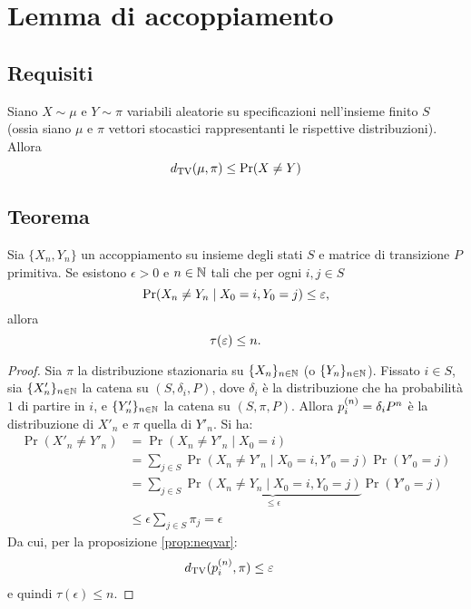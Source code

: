 \section{Lemma di accoppiamento}


\subsection{Requisiti}
\begin{prop}\label{prop:neqvar}
	Siano $X\sim\mu$ e $Y\sim\pi$ variabili aleatorie su specificazioni nell'insieme finito $S$ (ossia siano $\mu$ e $\pi$ vettori stocastici rappresentanti le rispettive distribuzioni). Allora
	\begin{equation*}
		\dtv(\mu,\pi)\le\Pr(X\ne Y)
	\end{equation*}
\end{prop}


\subsection{Teorema}
\begin{lemma}[di accoppiamento]
	Sia $\{X_n,Y_n\}$ un accoppiamento su insieme degli stati $S$ e matrice di transizione $P$ primitiva. Se esistono $\epsilon>0$ e $n\in\N$ tali che per ogni $i,j\in S$
	\begin{equation*}
		\Pr(X_n\ne Y_n\mid X_0=i,Y_0=j) \le \epsilon \text,
	\end{equation*}
	allora
	\begin{equation*}
		\tau(\epsilon) \le n \text.
	\end{equation*}
\end{lemma}
\begin{proof}
	Sia $\pi$ la distribuzione stazionaria su $\chain X$ (o $\chain Y$).
	Fissato $i\in S$, sia $\chain{X'}$ la catena su $(S,\delta_i,P)$, dove $\delta_i$ è la distribuzione che ha probabilità $1$ di partire in $i$, e $\chain{Y'}$ la catena su $(S,\pi,P)$. Allora $p\ape{n}_i=\delta_i P^n$ è la distribuzione di $X'_n$ e $\pi$ quella di $Y'_n$.
	Si ha:
	\begin{align*}
		\Pr(X'_n\ne Y'_n) & = \Pr(X_n\ne Y'_n\mid X_0=i)                                                          \\
		                  & = \sum_{j\in S} \Pr(X_n\ne Y'_n\mid X_0=i,Y'_0=j)\Pr(Y'_0=j)                          \\
		                  & = \sum_{j\in S} \underbrace{\Pr(X_n\ne Y_n\mid X_0=i,Y_0=j)}_{\le\epsilon}\Pr(Y'_0=j) \\
		                  & \le \epsilon \sum_{j\in S} \pi_j = \epsilon
	\end{align*}
	Da cui, per la proposizione \ref{prop:neqvar}:
	\begin{align*}
		\dtv(p\ape{n}_i,\pi) & \le \epsilon
	\end{align*}
	e quindi $\tau(\epsilon)\le n$.
\end{proof}
